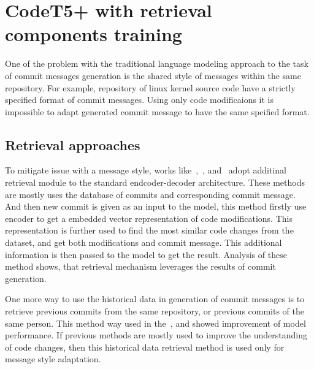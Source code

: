 \section{CodeT5+ with retrieval components training}\label{sec:codeT5_with_retrieval_train}
One of the problem with the traditional language modeling approach to the task of commit messages generation is the shared style of messages within the same repository. For example, repository of linux kernel source code have a strictly specified format of commit messages. Using only code modificaions it is impossible to adapt generated commit message to have the same spcified format. 

\subsection{Retrieval approaches}\label{subsec:retrieval_existing_methods}
To mitigate issue with a message style, works like~\cite{shi2022race},~\cite{liu2020atom}, and~\cite{wang2021context} adopt additinal retrieval module to the standard endcoder-decoder architecture. These methods are mostly uses the database of commits and corresponding commit message. And then new commit is given as an input to the model, this method firstly use encoder to get a embedded vector representation of code modifications. This representation is further used to find the most similar code changes from the dataset, and get both modifications and commit message. This additional information is then passed to the model to get the result. Analysis of these method shows, that retrieval mechanism leverages the results of commit generation. 

One more way to use the historical data in generation of commit messages is to retrieve previous commits from the same repository, or previous commits of the same person. This method way used in the~\cite{eliseeva2023commit}, and showed improvement of model performance. If previous methods are mostly used to improve the understanding of code changes, then this historical data retrieval method is used only for message style adaptation.   

